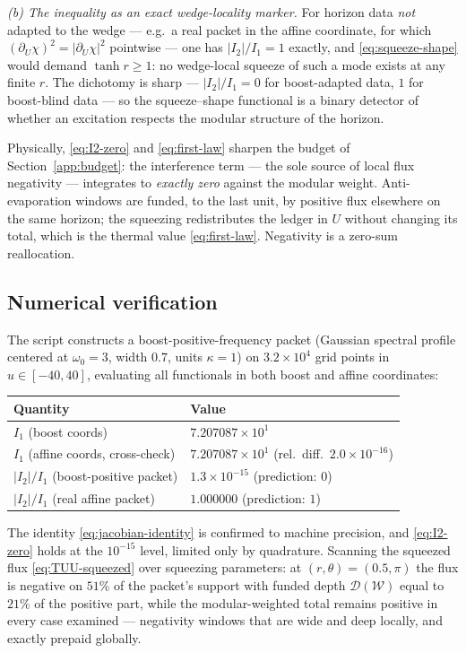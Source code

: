 \documentclass[11pt]{article}
\begin{document}
\emph{(b) The inequality as an exact wedge-locality marker.} For horizon data \emph{not} adapted to the wedge --- e.g.\ a real packet in the affine coordinate, for which $(\partial_U\chi)^2 = |\partial_U\chi|^2$ pointwise --- one has $|I_2|/I_1 = 1$ exactly, and \eqref{eq:squeeze-shape} would demand $\tanh r \ge 1$: no wedge-local squeeze of such a mode exists at any finite $r$. The dichotomy is sharp --- $|I_2|/I_1 = 0$ for boost-adapted data, $1$ for boost-blind data --- so the squeeze--shape functional is a binary detector of whether an excitation respects the modular structure of the horizon.

Physically, \eqref{eq:I2-zero} and \eqref{eq:first-law} sharpen the budget of Section~\ref{app:budget}: the interference term --- the sole source of local flux negativity --- integrates to \emph{exactly zero} against the modular weight. Anti-evaporation windows are funded, to the last unit, by positive flux elsewhere on the same horizon; the squeezing redistributes the ledger in $U$ without changing its total, which is the thermal value \eqref{eq:first-law}. Negativity is a zero-sum reallocation.

\subsection{Numerical verification}
\label{app:numerics-table}

The script constructs a boost-positive-frequency packet (Gaussian spectral profile centered at $\omega_0 = 3$, width $0.7$, units $\kappa = 1$) on $3.2\times 10^4$ grid points in $u \in [-40, 40]$, evaluating all functionals in both boost and affine coordinates:

\begin{center}
\begin{tabular}{l l}
\hline
Quantity & Value \\
\hline
$I_1$ (boost coords) & $7.207087\times 10^{1}$ \\
$I_1$ (affine coords, cross-check) & $7.207087\times 10^{1}$ \quad (rel.\ diff.\ $2.0\times10^{-16}$) \\
$|I_2|/I_1$ (boost-positive packet) & $1.3\times 10^{-15}$ \quad (prediction: $0$) \\
$|I_2|/I_1$ (real affine packet) & $1.000000$ \quad (prediction: $1$) \\
\hline
\end{tabular}
\end{center}

\noindent
The identity \eqref{eq:jacobian-identity} is confirmed to machine precision, and \eqref{eq:I2-zero} holds at the $10^{-15}$ level, limited only by quadrature. Scanning the squeezed flux \eqref{eq:TUU-squeezed} over squeezing parameters: at $(r, \theta) = (0.5, \pi)$ the flux is negative on $51\%$ of the packet's support with funded depth $\mathcal{D}(\mathcal{W})$ equal to $21\%$ of the positive part, while the modular-weighted total remains positive in every case examined --- negativity windows that are wide and deep locally, and exactly prepaid globally.
\end{document}
